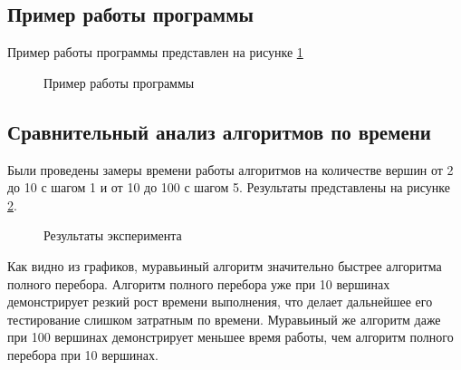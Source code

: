 \documentclass{article}
\begin{document}
	\subsection{Пример работы программы}
	Пример работы программы представлен на рисунке \hyperref[programmWork]{\ref{programmWork}}
	 	\begin{figure}[h!]
		 	\caption{Пример работы программы}
		 	\label{programmWork}
	 	\end{figure}
	
	\subsection{Сравнительный анализ алгоритмов по времени}
	Были проведены замеры времени работы алгоритмов на количестве вершин от 2 до 10 с шагом 1 и от 10 до 100 с шагом 5. Результаты представлены на рисунке \hyperref[test2]{\ref{test2}}.
	\begin{figure}[h!]
		 	\caption{Результаты эксперимента}
		 	\label{test2}
	 	\end{figure}

	\indent Как видно из графиков, муравьиный алгоритм значительно быстрее алгоритма полного перебора. Алгоритм полного перебора уже при 10 вершинах демонстрирует резкий рост времени выполнения, что делает дальнейшее его тестирование слишком затратным по времени. Муравьиный же алгоритм даже при 100 вершинах демонстрирует меньшее время работы, чем алгоритм полного перебора при 10 вершинах.
	
\end{document}
